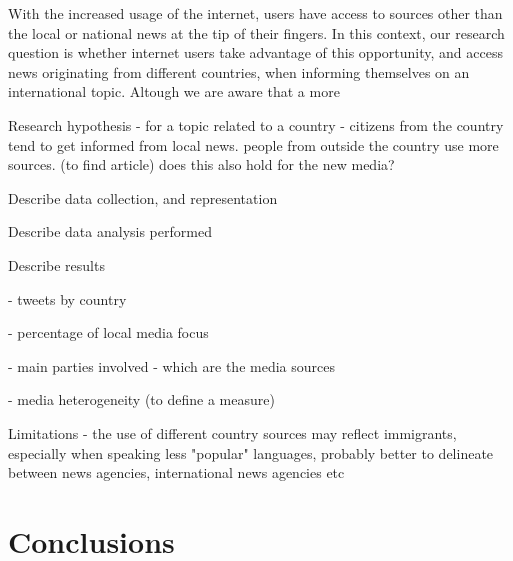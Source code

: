\documentclass{acm_proc_10ptArticle-sp}
\begin{document}
With the increased usage of the internet, users have access to sources other than the local or national news at the tip of their fingers. In this context, our research question is whether internet users take advantage of this opportunity, and access news originating from different countries, when informing themselves on an international topic. Altough we are aware that a more 

Research hypothesis - for a topic related to a country - citizens from the country tend to get informed from local news. people from outside the country use more sources. (to find article) does this also hold for the new media?

Describe data collection, and representation

Describe data analysis performed

Describe results

- tweets by country

- percentage of local media focus

- main parties involved - which are the media sources

- media heterogeneity (to define a measure)

Limitations - the use of different country sources may reflect immigrants, especially when speaking less "popular" languages, probably better to delineate between news agencies, international news agencies etc

\section{Conclusions} 



\end{document}
